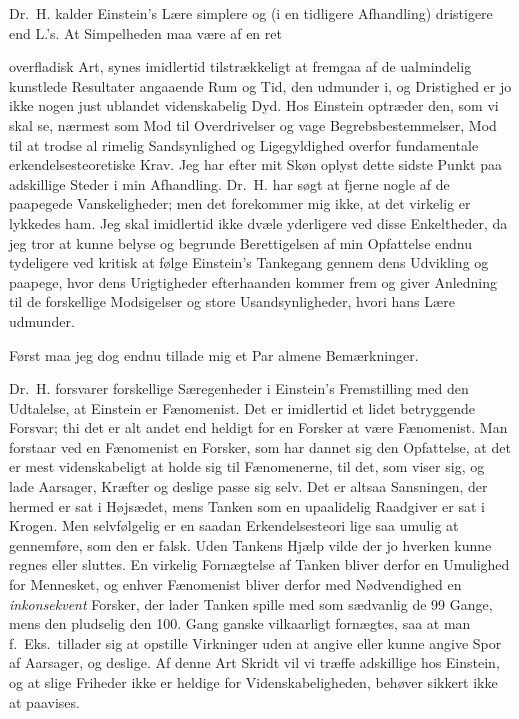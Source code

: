 \documentclass[12pt,a4paper]{article}
\newcommand{\opage}[1]{\marginnote{\footnotesize\textit{[#1]}}}
\begin{document}
Dr.\ H. kalder Einstein's Lære simplere og (i en tidligere Afhandling)
dristigere end L.'s. At Simpelheden maa være af en ret

\opage{194} overfladisk Art, synes imidlertid tilstrækkeligt at fremgaa af de ualmindelig
kunstlede Resultater angaaende Rum og Tid, den udmunder i, og Dristighed er jo
ikke nogen just ublandet videnskabelig Dyd. Hos Einstein optræder den, som vi
skal se, nærmest som Mod til Overdrivelser og vage Begrebsbestemmelser, Mod til
at trodse al rimelig Sandsynlighed og Ligegyldighed overfor fundamentale
erkendelsesteoretiske Krav. Jeg har efter mit Skøn oplyst dette sidste Punkt
paa adskillige Steder i min Afhandling. Dr.\ H. har søgt at fjerne nogle af de
paapegede Vanskeligheder; men det forekommer mig ikke, at det virkelig er
lykkedes ham. Jeg skal imidlertid ikke dvæle yderligere ved disse Enkeltheder,
da jeg tror at kunne belyse og begrunde Berettigelsen af min Opfattelse endnu
tydeligere ved kritisk at følge Einstein's Tankegang gennem dens Udvikling og
paapege, hvor dens Urigtigheder efterhaanden kommer frem og giver Anledning til
de forskellige Modsigelser og store Usandsynligheder, hvori hans Lære udmunder.

Først maa jeg dog endnu tillade mig et Par almene Bemærkninger.

Dr.\ H. forsvarer forskellige Særegenheder i Einstein's Fremstilling med den
Udtalelse, at Einstein er Fænomenist. Det er imidlertid et lidet betryggende
Forsvar; thi det er alt andet end heldigt for en Forsker at være Fænomenist.
Man forstaar ved en Fænomenist en Forsker, som har dannet sig den Opfattelse,
at det er mest videnskabeligt at holde sig til Fænomenerne, til det,
\guillemotright som viser sig\guillemotleft, og lade Aarsager, Kræfter og
deslige passe sig selv. Det er altsaa Sansningen, der hermed er sat i
Højsædet, mens Tanken som en upaalidelig Raadgiver er sat i Krogen. Men
selvfølgelig er en saadan Erkendelsesteori lige saa umulig at gennemføre, som
den er falsk. Uden Tankens Hjælp vilde der jo hverken kunne regnes eller
sluttes. En virkelig Fornægtelse af Tanken bliver derfor en Umulighed for
Mennesket, og enhver Fænomenist bliver derfor med Nødvendighed en
\emph{inkonsekvent} Forsker, der lader Tanken spille med som sædvanlig de 99
Gange, mens den pludselig den 100. Gang ganske vilkaarligt fornægtes, saa at
man f.\ Eks.\ tillader sig at opstille Virkninger uden at angive eller kunne
angive Spor af Aarsager, og deslige. Af denne Art Skridt vil vi træffe
adskillige hos Einstein, og at slige Friheder ikke er heldige for
Videnskabeligheden, behøver sikkert ikke at paavises.
\end{document}

